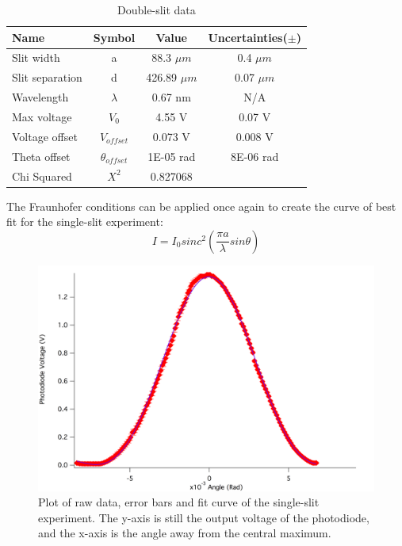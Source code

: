 \documentclass[prb,preprint]{revtex4-1}
\begin{document}
\begin{table}[h]
\centering
\caption{Double-slit data}
\begin{ruledtabular}
\begin{tabular}{ l c c c}
Name & Symbol & Value & Uncertainties($\pm$)\\
\hline
Slit width & a & 88.3 $\mu m$ & 0.4 $\mu m$\\
Slit separation & d & 426.89 $\mu m$ & 0.07 $\mu m$\\
Wavelength & $\lambda$ & 0.67 nm & N/A \\
Max voltage & $V_0$ & 4.55 V & 0.07 V\\
Voltage offset & $V_{offset}$ & 0.073 V & 0.008 V\\
Theta offset &$ \theta_{offset}$ & 1E-05 rad & 8E-06 rad \\
\hline
Chi Squared & $X^2$ & 0.827068&
\end{tabular}
\end{ruledtabular}
\label{data}
\end{table}

\newpage

The Fraunhofer conditions can be applied once again to create  the curve of best fit for the single-slit experiment: 
\begin{equation}
I=I_0 sinc^2 (\frac{\pi a}{\lambda} sin\theta)
\label{eq2}
\end{equation}

\begin{figure}[h]
\centering
\includegraphics[width=6.6in]{single.png}
\caption{Plot of raw data, error bars and fit curve of the single-slit experiment. The y-axis is still the output voltage of the photodiode, and the x-axis is the angle away from the central maximum.}
\label{single}
\end{figure}
\end{document}
